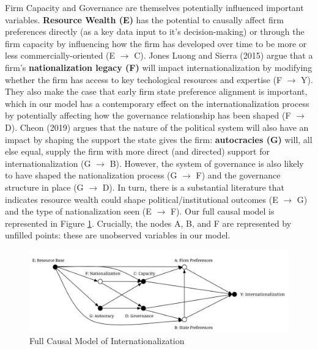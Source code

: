 \documentclass[11pt,]{book}
\begin{document}
Firm Capacity and Governance are themselves potentially influenced important variables. \textbf{Resource Wealth (E)} has the potential to causally affect firm preferences directly (as a key data input to it's decision-making) or through the firm capacity by influencing how the firm has developed over time to be more or less commercially-oriented (E \(\rightarrow\) C). Jones Luong and Sierra (2015) argue that a firm's \textbf{nationalization legacy (F)} will impact internationalization by modifying whether the firm has access to key techological resources and expertise (F \(\rightarrow\) Y). They also make the case that early firm state preference alignment is important, which in our model has a contemporary effect on the internationalization process by potentially affecting how the governance relationship has been shaped (F \(\rightarrow\) D). Cheon (2019) argues that the nature of the political system will also have an impact by shaping the support the state gives the firm: \textbf{autocracies (G)} will, all else equal, supply the firm with more direct (and directed) support for internationalization (G \(\rightarrow\) B). However, the system of governance is also likely to have shaped the nationalization process (G \(\rightarrow\) F) and the governance structure in place (G \(\rightarrow\) D). In turn, there is a substantial literature that indicates resource wealth could shape political/institutional outcomes (E \(\rightarrow\) G) and the type of nationalization seen (E \(\rightarrow\) F). Our full causal model is represented in Figure \ref{fig:fullmodel}. Crucially, the nodes A, B, and F are represented by unfilled points: these are unobserved variables in our model.

\begin{figure}

{\centering \includegraphics[width=0.8\linewidth]{fig/full_model} 

}

\caption{Full Causal Model of Internationalization}\label{fig:fullmodel}
\end{figure}
\end{document}
